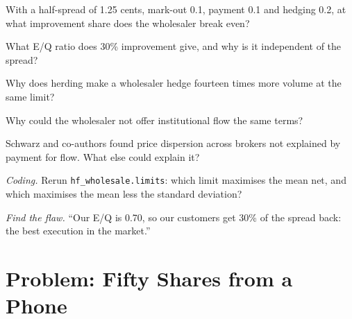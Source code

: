 \begin{exercise}[$\star$]\label{exo:hf:retail-wholesaling:2}
With a half-spread of 1.25 cents, mark-out 0.1, payment 0.1 and hedging 0.2, at what improvement share does the wholesaler break even?
\end{exercise}

\begin{exercise}[$\star$]\label{exo:hf:retail-wholesaling:3}
What E/Q ratio does 30\% improvement give, and why is it independent of the spread?
\end{exercise}

\begin{exercise}[$\star\star$]\label{exo:hf:retail-wholesaling:4}
Why does herding make a wholesaler hedge fourteen times more volume at the same limit?
\end{exercise}

\begin{exercise}[$\star\star$]\label{exo:hf:retail-wholesaling:5}
Why could the wholesaler not offer institutional flow the same terms?
\end{exercise}

\begin{exercise}[$\star\star$]\label{exo:hf:retail-wholesaling:6}
Schwarz and co-authors found price dispersion across brokers not explained by payment for flow. What else could explain it?
\end{exercise}

\begin{exercise}[$\star\star\star$]\label{exo:hf:retail-wholesaling:7}
\emph{Coding.} Rerun \texttt{hf\_wholesale.limits}: which limit maximises the mean net, and which maximises the mean less the standard deviation?
\end{exercise}

\begin{exercise}[$\star\star\star$]\label{exo:hf:retail-wholesaling:8}
\emph{Find the flaw.} ``Our E/Q is 0.70, so our customers get 30\% of the spread back: the best execution in the market.''
\end{exercise}

\section{Problem: Fifty Shares from a Phone}

